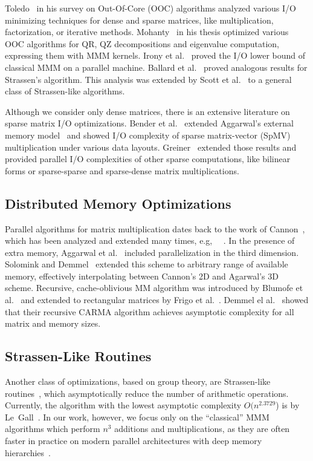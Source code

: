 \documentclass[sigplan,review,anonymous,10pt]{acmart}\settopmatter{printfolios=true,printccs=false,printacmref=false}
\begin{document}
Toledo~\cite{IOsurvey} in his survey on Out-Of-Core (OOC) algorithms analyzed 
various I/O minimizing techniques for dense and sparse matrices, like 
multiplication, factorization, or iterative methods. 
Mohanty~\cite{MohantyThesis} in his thesis optimized various OOC algorithms for 
QR, QZ decompositions and eigenvalue computation, expressing them with MMM 
kernels. Irony et 
al.~\cite{IronyMMM} proved the I/O lower bound of classical MMM on a parallel 
machine. Ballard et al.~\cite{strassenBounds} proved analogous results for 
Strassen's algorithm. This analysis was extended by Scott et 
al.~\cite{generalStrassenBounds} to a general class of Strassen-like algorithms.

Although we consider only dense matrices, there is an extensive literature on 
sparse matrix I/O optimizations. Bender et al.~\cite{SpMVIO} extended 
Aggarwal's external memory model~\cite{externalMem} and showed I/O complexity 
of sparse matrix-vector (SpMV) multiplication under various data layouts. 
Greiner~\cite{SpEverything} extended those results and provided parallel I/O 
complexities of other sparse computations, like bilinear forms or sparse-sparse 
and sparse-dense matrix multiplications.


\subsection{Distributed Memory Optimizations}
Parallel algorithms for matrix multiplication dates back to the work of 
Cannon~\cite{Cannon}, which has been analyzed and extended many times, e.g, 
~\cite{MManalysis}~\cite{generalCannon}. In the presence of extra memory, 
Aggarwal et al.~\cite{summa3d} included parallelization in the third dimension. 
Solomink and Demmel~\cite{25d} extended this scheme to arbitrary range of 
available memory, effectively interpolating between Cannon's 2D and Agarwal's 
3D scheme. Recursive, cache-oblivious MM algorithm was introduced by Blumofe 
et al.~\cite{recursiveMM} and extended to rectangular matrices by Frigo et 
al.~\cite{recursiveRectangularMM}. Demmel el al.~\cite{CARMA} showed that their 
recursive CARMA algorithm achieves asymptotic complexity for all matrix and 
memory sizes. 

\subsection{Strassen-Like Routines}

Another class of optimizations, based on group theory,
are Strassen-like routines~\cite{Strassen}, which asymptotically reduce the
number of arithmetic operations. Currently, the algorithm with the lowest
asymptotic complexity $O(n^{2.3729}$) is by Le~Gall~\cite{LeGall}. In our work,
however, we focus only on the ``classical'' MMM algorithms which perform $n^3$
additions and multiplications, as they are often faster in practice on modern 
parallel architectures with deep memory hierarchies~\cite{strassenVsClassic}.  
\end{document}

